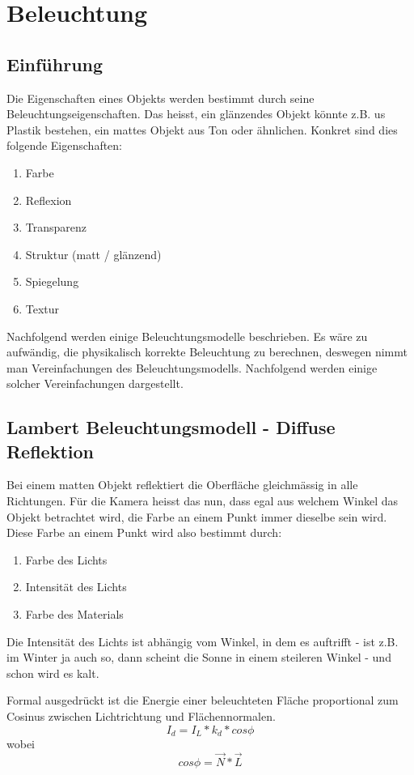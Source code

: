 \chapter{Beleuchtung}

\section{Einführung}
Die Eigenschaften eines Objekts werden bestimmt durch seine Beleuchtungseigenschaften. Das heisst, ein glänzendes Objekt könnte z.B. us Plastik bestehen, ein mattes Objekt aus Ton oder ähnlichen. Konkret sind dies folgende Eigenschaften:
\begin{enumerate}
	\item Farbe
	\item Reflexion
	\item Transparenz
	\item Struktur (matt / glänzend)
	\item Spiegelung
	\item Textur
\end{enumerate}
Nachfolgend werden einige Beleuchtungsmodelle beschrieben. Es wäre zu aufwändig, die physikalisch korrekte Beleuchtung zu berechnen, deswegen nimmt man Vereinfachungen des Beleuchtungsmodells. Nachfolgend werden einige solcher Vereinfachungen dargestellt.
\section{Lambert Beleuchtungsmodell - Diffuse Reflektion}

Bei einem matten Objekt reflektiert die Oberfläche gleichmässig in alle Richtungen. Für die Kamera heisst das nun, dass egal aus welchem Winkel das Objekt betrachtet wird, die Farbe an einem Punkt immer dieselbe sein wird. Diese Farbe an einem Punkt wird also bestimmt durch:
\begin{enumerate}
	\item Farbe des Lichts
	\item Intensität des Lichts
	\item Farbe des Materials
\end{enumerate}
Die Intensität des Lichts ist abhängig vom Winkel, in dem es auftrifft - ist z.B. im Winter ja auch so, dann scheint die Sonne in einem steileren Winkel - und schon wird es kalt.

Formal ausgedrückt ist die Energie einer beleuchteten Fläche proportional zum Cosinus zwischen Lichtrichtung und Flächennormalen.
\begin{displaymath}
I_d = I_L * k_d * cos \phi
\end{displaymath}
wobei 
\begin{displaymath}
cos \phi = \vec{N}*\vec{L}
\end{displaymath}

